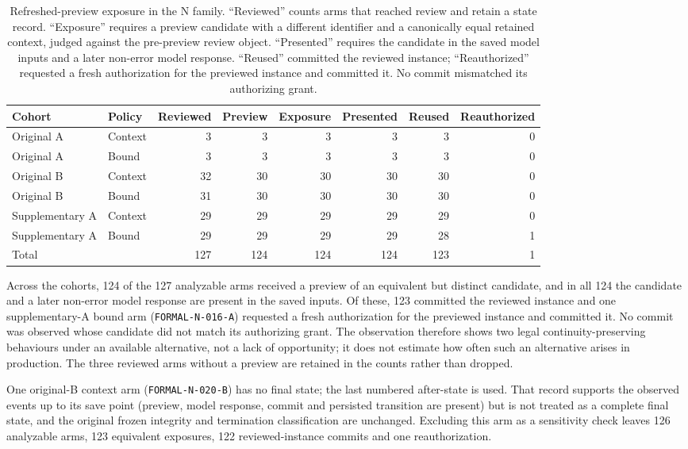 \documentclass[10pt,a4paper]{article}
\begin{document}
\begin{table}[htbp]
\centering\footnotesize
\setlength{\tabcolsep}{3pt}
\caption{Refreshed-preview exposure in the N family. ``Reviewed'' counts arms that reached review and retain a state record. ``Exposure'' requires a preview candidate with a different identifier and a canonically equal retained context, judged against the pre-preview review object. ``Presented'' requires the candidate in the saved model inputs and a later non-error model response. ``Reused'' committed the reviewed instance; ``Reauthorized'' requested a fresh authorization for the previewed instance and committed it. No commit mismatched its authorizing grant.}
\begin{tabular}{@{}llrrrrrr@{}}
\toprule
Cohort & Policy & Reviewed & Preview & Exposure & Presented & Reused & Reauthorized \\
\midrule
Original A & Context & 3 & 3 & 3 & 3 & 3 & 0 \\
Original A & Bound & 3 & 3 & 3 & 3 & 3 & 0 \\
Original B & Context & 32 & 30 & 30 & 30 & 30 & 0 \\
Original B & Bound & 31 & 30 & 30 & 30 & 30 & 0 \\
Supplementary A & Context & 29 & 29 & 29 & 29 & 29 & 0 \\
Supplementary A & Bound & 29 & 29 & 29 & 29 & 28 & 1 \\
\midrule
Total & & 127 & 124 & 124 & 124 & 123 & 1 \\
\bottomrule
\end{tabular}
\end{table}

Across the cohorts, 124 of the 127 analyzable arms received a preview of an equivalent but distinct candidate, and in all 124 the candidate and a later non-error model response are present in the saved inputs. Of these, 123 committed the reviewed instance and one supplementary-A bound arm (\texttt{FORMAL-N-016-A}) requested a fresh authorization for the previewed instance and committed it. No commit was observed whose candidate did not match its authorizing grant. The observation therefore shows two legal continuity-preserving behaviours under an available alternative, not a lack of opportunity; it does not estimate how often such an alternative arises in production. The three reviewed arms without a preview are retained in the counts rather than dropped.

One original-B context arm (\texttt{FORMAL-N-020-B}) has no final state; the last numbered after-state is used. That record supports the observed events up to its save point (preview, model response, commit and persisted transition are present) but is not treated as a complete final state, and the original frozen integrity and termination classification are unchanged. Excluding this arm as a sensitivity check leaves 126 analyzable arms, 123 equivalent exposures, 122 reviewed-instance commits and one reauthorization.
\end{document}
